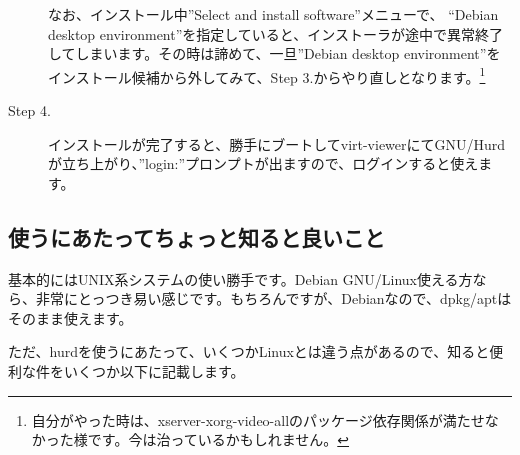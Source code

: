 \documentclass[mingoth,a4paper]{jsarticle}
\begin{document}
\begin{description}
なお、インストール中''Select and install software''メニューで、
``Debian desktop environment''を指定していると、インストーラが途中で異常終了してしまいます。その時は諦めて、一旦''Debian desktop environment''をインストール候補から外してみて、Step 3.からやり直しとなります。\footnote{自分がやった時は、xserver-xorg-video-allのパッケージ依存関係が満たせなかった様です。今は治っているかもしれません。}
\item [Step 4.] インストールが完了すると、勝手にブートしてvirt-viewerにてGNU/Hurdが立ち上がり、''login:''プロンプトが出ますので、ログインすると使えます。
\end{description}

\subsection{使うにあたってちょっと知ると良いこと}

 基本的にはUNIX系システムの使い勝手です。Debian GNU/Linux使える方なら、非常にとっつき易い感じです。もちろんですが、Debianなので、dpkg/aptはそのまま使えます。

 ただ、hurdを使うにあたって、いくつかLinuxとは違う点があるので、知ると便利な件をいくつか以下に記載します。
\end{document}
